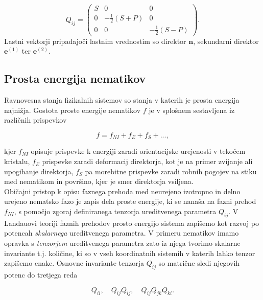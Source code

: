 \documentclass[longbibliography,slovene,a4paper,12pt]{book}
\begin{document}
\begin{equation}
Q_{ij} = \begin{pmatrix} S & 0 & 0 \\
				0 & -\frac{1}{2}(S+P) & 0 \\
				0 & 0 & -\frac{1}{2}(S-P)	
	   \end{pmatrix}.
\label{uniaxialQ}
\end{equation}
Lastni vektorji pripadajoči lastnim vrednostim so direktor $\mathbf{n}$, sekundarni direktor $\mathbf{e}^{(1)}$ ter $\mathbf{e}^{(2)}$.

\subsection{Prosta energija nematikov}

Ravnovesna stanja fizikalnih sistemov so stanja v katerih je prosta energija najnižja. Gostota proste energije nematikov $f$ je v splošnem sestavljena iz različnih prispevkov

\begin{equation}
f = f_{NI} + f_{E} + f_S + ...,
\label{lcfe}
\end{equation}

kjer $f_{NI}$ opisuje prispevke k energiji zaradi orientacijske urejenosti v tekočem kristalu, $f_E$ prispevke zaradi deformacij direktorja, kot je na primer zvijanje ali upogibanje direktorja, $f_S$ pa morebitne prispevke zaradi robnih pogojev na stiku med nematikom in površino, kjer je smer direktorja vsiljena. \\

Običajni pristop k opisu faznega prehoda med neurejeno izotropno in delno urejeno nematsko fazo je zapis dela proste energije, ki se nanaša na fazni prehod $f_{NI}$, s pomočjo zgoraj definiranega tenzorja ureditvenega parametra $Q_{ij}$. V Landauovi teoriji faznih prehodov prosto energijo sistema zapišemo kot razvoj po potencah \emph{skalarnega} ureditvenega parametra. V primeru nematikov imamo opravka s \emph{tenzorjem} ureditvenega parametra zato iz njega tvorimo skalarne invariante t.j. količine, ki so v vseh koordinatnih sistemih v katerih lahko tenzor zapišemo enake. Osnovne invariante tenzorja $Q_{ij}$ so matrične sledi njegovih potenc do tretjega reda

\begin{equation}
Q_{ii}, \quad Q_{ij}Q_{ij}, \quad Q_{ij}Q_{jk}Q_{ki}.
\label{Qtraces}
\end{equation}
\end{document}
